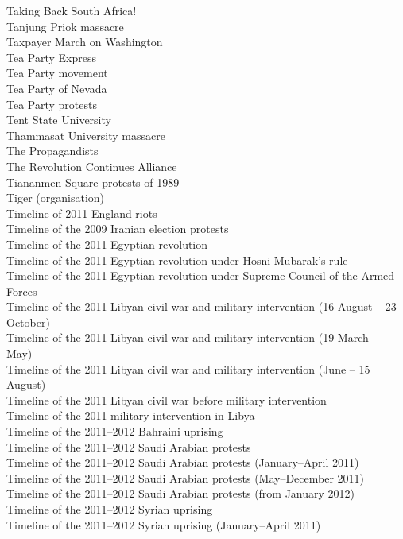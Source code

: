 Taking Back South Africa!\\
Tanjung Priok massacre\\
Taxpayer March on Washington\\
Tea Party Express\\
Tea Party movement\\
Tea Party of Nevada\\
Tea Party protests\\
Tent State University\\
Thammasat University massacre\\
The Propagandists\\
The Revolution Continues Alliance\\
Tiananmen Square protests of 1989\\
Tiger (organisation)\\
Timeline of 2011 England riots\\
Timeline of the 2009 Iranian election protests\\
Timeline of the 2011 Egyptian revolution\\
Timeline of the 2011 Egyptian revolution under Hosni Mubarak's rule\\
Timeline of the 2011 Egyptian revolution under Supreme Council of the Armed Forces\\
Timeline of the 2011 Libyan civil war and military intervention (16 August – 23 October)\\
Timeline of the 2011 Libyan civil war and military intervention (19 March – May)\\
Timeline of the 2011 Libyan civil war and military intervention (June – 15 August)\\
Timeline of the 2011 Libyan civil war before military intervention\\
Timeline of the 2011 military intervention in Libya\\
Timeline of the 2011–2012 Bahraini uprising\\
Timeline of the 2011–2012 Saudi Arabian protests\\
Timeline of the 2011–2012 Saudi Arabian protests (January–April 2011)\\
Timeline of the 2011–2012 Saudi Arabian protests (May–December 2011)\\
Timeline of the 2011–2012 Saudi Arabian protests (from January 2012)\\
Timeline of the 2011–2012 Syrian uprising\\
Timeline of the 2011–2012 Syrian uprising (January–April 2011)\\
